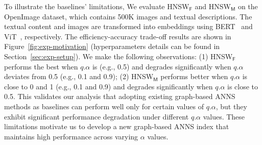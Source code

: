 To illustrate the baselines' limitations, We evaluate \textsf{HNSW}$_{\textsf{F}}$ and \textsf{HNSW}${_\textsf{M}}$ on the \textsf{OpenImage} dataset, which contains 500K images and %
textual descriptions. The textual content and images are transformed into embeddings using BERT~\cite{devlin2018bert} and ViT~\cite{dosovitskiy2020image}, respectively. The efficiency-accuracy trade-off results are shown in Figure~\ref{fig:exp-motivation}
(hyperparameters details can be found in Section~\ref{sec:exp-setup}).
We make the following observations: 
(1) \textsf{HNSW}$_{\textsf{F}}$ 
performs the best when $q.\alpha$ is %
(e.g., 0.5) 
and degrades significantly when $q.\alpha$ deviates from 0.5 (e.g., 0.1 and 0.9);
(2) \textsf{HNSW}$_{\textsf{M}}$ 
performs better when $q.\alpha$ is close to 0 and 1 (e.g., 0.1 and 0.9) and degrades significantly when $q.\alpha$ is close to 0.5. 
This validates our analysis that adopting existing graph-based ANNS methods as baselines can perform well only for certain values of $q.\alpha$, but they exhibit significant performance degradation under different $q.\alpha$ values. These limitations motivate us to develop a new graph-based ANNS index that maintains high performance across varying $\alpha$ values.

